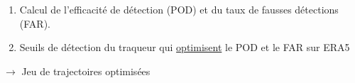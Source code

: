 \documentclass[aspectratio=169, usepdftitle=false, xcolor={dvipsnames}, 9pt,table]{beamer}
\begin{document}
\begin{frame}[t]
\begin{columns}[t]
\begin{column}{0.6\textwidth}
{                \scriptsize
                \begin{definition}
                    \setlength{\leftmargini}{2.5ex}
                    \begin{enumerate}
                        \item Calcul de l'efficacité de détection (POD) et du taux de fausses détections (FAR).
                        \item Seuils de détection du traqueur qui \underline{optimisent} le POD et le FAR sur ERA5
                    \end{enumerate}
                    $\longrightarrow$ Jeu de trajectoires \alert{optimisées}
                    \vspace{-1em}
                \end{definition}
            }
        \end{column}
    \end{columns} 
\end{frame}
\end{document}
